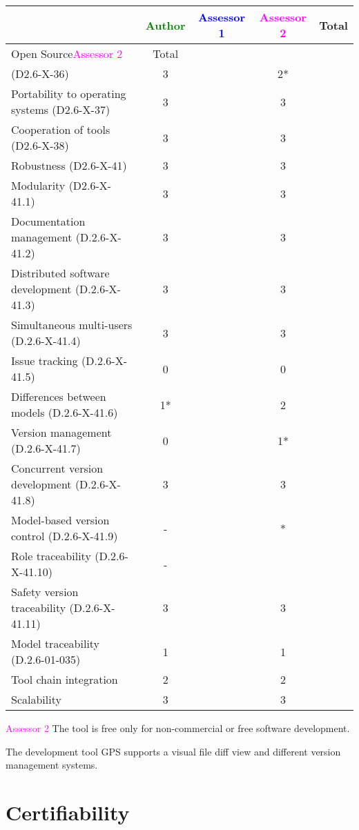 \begin{tabular}{|l | c | c | c | c|}
\hline
& \textcolor{green}{Author} & \textcolor{blue}{Assessor 1} & \textcolor{magenta}{Assessor 2} & Total \\
\hline 
Open Source\textcolor{magenta}{Assessor 2} & Total \\ (D2.6-X-36) & 3 & & 2*&  \\
\hline 
Portability to operating systems (D2.6-X-37) & 3 & & 3 &  \\
\hline
Cooperation of tools (D2.6-X-38) & 3 & & 3 &  \\
\hline
Robustness (D2.6-X-41) & 3 & & 3 & \\
\hline
Modularity (D2.6-X-41.1) & 3 & & 3 & \\
\hline
Documentation management (D.2.6-X-41.2) & 3 & & 3 & \\
\hline
Distributed software development (D.2.6-X-41.3)  & 3 & & 3 & \\
\hline
Simultaneous multi-users (D.2.6-X-41.4)   & 3 & & 3 & \\
\hline
Issue tracking (D.2.6-X-41.5) & 0 & & 0 & \\
\hline
Differences between models (D.2.6-X-41.6) & 1* & & 2 & \\
\hline
Version management (D.2.6-X-41.7) & 0 & & 1* & \\
\hline
Concurrent version development (D.2.6-X-41.8) & 3 & & 3 & \\
\hline
Model-based version control (D.2.6-X-41.9) & - & & * & \\
\hline
Role traceability (D.2.6-X-41.10) & - & & & \\
\hline
Safety version traceability (D.2.6-X-41.11) & 3 & & 3 & \\
\hline
Model traceability (D.2.6-01-035) & 1 & & 1 & \\
\hline
Tool chain integration & 2 & & 2 & \\
\hline
Scalability & 3 & & 3 & \\
\hline
\end{tabular}

\textcolor{magenta}{Assessor 2} The tool is free only for non-commercial or free
software development.

The development tool GPS supports a visual file diff view and different version
management systems.

\section{Certifiability}

